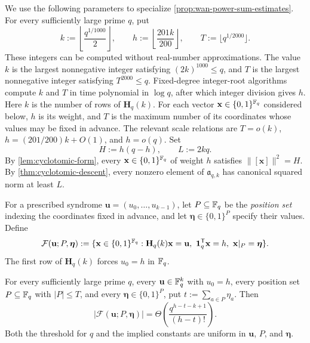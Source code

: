 We use the following parameters to specialize
\cref{prop:wan-power-sum-estimates}.
For every sufficiently large prime $q$, put
\begin{equation}
\label{eq:rs-parameters}
 k:=\left\lfloor\frac{q^{1/1000}}2\right\rfloor,
 \qquad
 h:=\left\lfloor\frac{201k}{200}\right\rfloor,
 \qquad
 T:=\lfloor q^{1/2000}\rfloor.
\end{equation}
These integers can be computed without real-number
approximations.  The value $k$ is the largest nonnegative integer satisfying
$(2k)^{1000}\le q$, and $T$ is the largest nonnegative integer satisfying
$T^{2000}\le q$.  Fixed-degree integer-root algorithms compute $k$ and $T$
in time polynomial in $\log q$, after which integer division gives $h$.
Here $k$ is the number of rows of $\mathbf H_q(k)$.  For each
vector $\mathbf x\in\{0,1\}^{\mathbb F_q}$ considered below, $h$ is its weight, and $T$
is the maximum number of its coordinates whose values may be fixed in
advance.  The relevant scale relations are
$T=o(k)$, $h=(201/200)k+O(1)$, and $h=o(q)$.  Set
\begin{equation}
\label{eq:HL-parameters}
 H:=h(q-h),
 \qquad
 L:=2kq.
\end{equation}
By \cref{lem:cyclotomic-form}, every
$\mathbf x\in\{0,1\}^{\mathbb F_q}$ of weight $h$ satisfies $\|[\mathbf x]\|^2=H$.
By \cref{thm:cyclotomic-descent}, every nonzero element of
$\mathfrak a_{q,k}$ has canonical squared norm at least $L$.

For a prescribed syndrome $\mathbf u=(u_0,\ldots,u_{k-1})$, let
$P\subseteq\mathbb F_q$ be the \emph{position set} indexing the coordinates fixed
in advance, and let $\boldsymbol\eta\in\{0,1\}^P$ specify their values.
Define
\[
 \mathcal F(\mathbf u;P,\boldsymbol\eta):=
 \{\mathbf x\in\{0,1\}^{\mathbb F_q}:\mathbf H_q(k)\mathbf x=\mathbf u,\
 \mathbf1_q^{\mathsf T}\mathbf x=h,\
 \mathbf x|_P=\boldsymbol\eta\}.
 \]
The first row of $\mathbf H_q(k)$ forces $u_0=h$ in $\mathbb F_q$.

\begin{theorem}
\label{thm:uniform-completions}
For every sufficiently large prime $q$, every $\mathbf u\in\mathbb F_q^k$ with
$u_0=h$, every position set $P\subseteq\mathbb F_q$ with $|P|\le T$, and every
$\boldsymbol\eta\in\{0,1\}^P$, put $t:=\sum_{a\in P}\eta_a$.  Then
\begin{equation}
\label{eq:uniform-completion-bounds}
 |\mathcal F(\mathbf u;P,\boldsymbol\eta)|
 =\Theta\left(\frac{q^{h-t-k+1}}{(h-t)!}\right).
\end{equation}
 Both the threshold for $q$ and the implied constants are uniform in
 $\mathbf u$, $P$, and $\boldsymbol\eta$.
\end{theorem}

